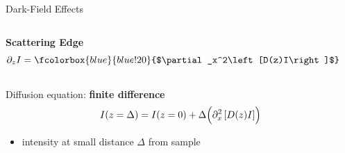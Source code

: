 \documentclass[
 ]{beamer}%
\begin{document}




\begin{frame}{Dark-Field Effects}
    \vspace{0.2cm}
    \begin{columns}
        \begin{column}{0.51\textwidth}
            \textbf{Scattering Edge}
            \begin{equation*}
                \partial_z I=\fcolorbox{blue}{blue!20}{$\partial_x^2\left[D(z)I\right]$}
            \end{equation*}
        \end{column}
        \begin{column}{0.4\textwidth}

            \vspace{-0.3cm}
            \scatteringedgeA
        \end{column}
    \end{columns}
    
    \vspace{-0.1cm}
    Diffusion equation: \textbf{finite difference}
    \begin{equation*}
        I(z=\Delta)=I(z=0)+\Delta\Bigl(\partial_x^2\left[D(z)I\right]\Bigr)
    \end{equation*}
    
    \vspace{-0.25cm}
    \begin{itemize}
        \item intensity at small distance $\Delta$ from sample
    \end{itemize}
\end{frame}
\end{document}
